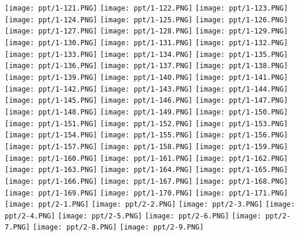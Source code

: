 \documentclass[UTF-8]{ctexart}
\begin{document}
\begin{center}
\texttt{[image: ppt/1-121.PNG]}
\texttt{[image: ppt/1-122.PNG]}
\texttt{[image: ppt/1-123.PNG]}
\texttt{[image: ppt/1-124.PNG]}
\texttt{[image: ppt/1-125.PNG]}
\texttt{[image: ppt/1-126.PNG]}
\texttt{[image: ppt/1-127.PNG]}
\texttt{[image: ppt/1-128.PNG]}
\texttt{[image: ppt/1-129.PNG]}
\texttt{[image: ppt/1-130.PNG]}
\texttt{[image: ppt/1-131.PNG]}
\texttt{[image: ppt/1-132.PNG]}
\texttt{[image: ppt/1-133.PNG]}
\texttt{[image: ppt/1-134.PNG]}
\texttt{[image: ppt/1-135.PNG]}
\texttt{[image: ppt/1-136.PNG]}
\texttt{[image: ppt/1-137.PNG]}
\texttt{[image: ppt/1-138.PNG]}
\texttt{[image: ppt/1-139.PNG]}
\texttt{[image: ppt/1-140.PNG]}
\texttt{[image: ppt/1-141.PNG]}
\texttt{[image: ppt/1-142.PNG]}
\texttt{[image: ppt/1-143.PNG]}
\texttt{[image: ppt/1-144.PNG]}
\texttt{[image: ppt/1-145.PNG]}
\texttt{[image: ppt/1-146.PNG]}
\texttt{[image: ppt/1-147.PNG]}
\texttt{[image: ppt/1-148.PNG]}
\texttt{[image: ppt/1-149.PNG]}
\texttt{[image: ppt/1-150.PNG]}
\texttt{[image: ppt/1-151.PNG]}
\texttt{[image: ppt/1-152.PNG]}
\texttt{[image: ppt/1-153.PNG]}
\texttt{[image: ppt/1-154.PNG]}
\texttt{[image: ppt/1-155.PNG]}
\texttt{[image: ppt/1-156.PNG]}
\texttt{[image: ppt/1-157.PNG]}
\texttt{[image: ppt/1-158.PNG]}
\texttt{[image: ppt/1-159.PNG]}
\texttt{[image: ppt/1-160.PNG]}
\texttt{[image: ppt/1-161.PNG]}
\texttt{[image: ppt/1-162.PNG]}
\texttt{[image: ppt/1-163.PNG]}
\texttt{[image: ppt/1-164.PNG]}
\texttt{[image: ppt/1-165.PNG]}
\texttt{[image: ppt/1-166.PNG]}
\texttt{[image: ppt/1-167.PNG]}
\texttt{[image: ppt/1-168.PNG]}
\texttt{[image: ppt/1-169.PNG]}
\texttt{[image: ppt/1-170.PNG]}
\texttt{[image: ppt/1-171.PNG]}
\newpage
\texttt{[image: ppt/2-1.PNG]}
\texttt{[image: ppt/2-2.PNG]}
\texttt{[image: ppt/2-3.PNG]}
\texttt{[image: ppt/2-4.PNG]}
\texttt{[image: ppt/2-5.PNG]}
\texttt{[image: ppt/2-6.PNG]}
\texttt{[image: ppt/2-7.PNG]}
\texttt{[image: ppt/2-8.PNG]}
\texttt{[image: ppt/2-9.PNG]}

\end{center}
\end{document}
